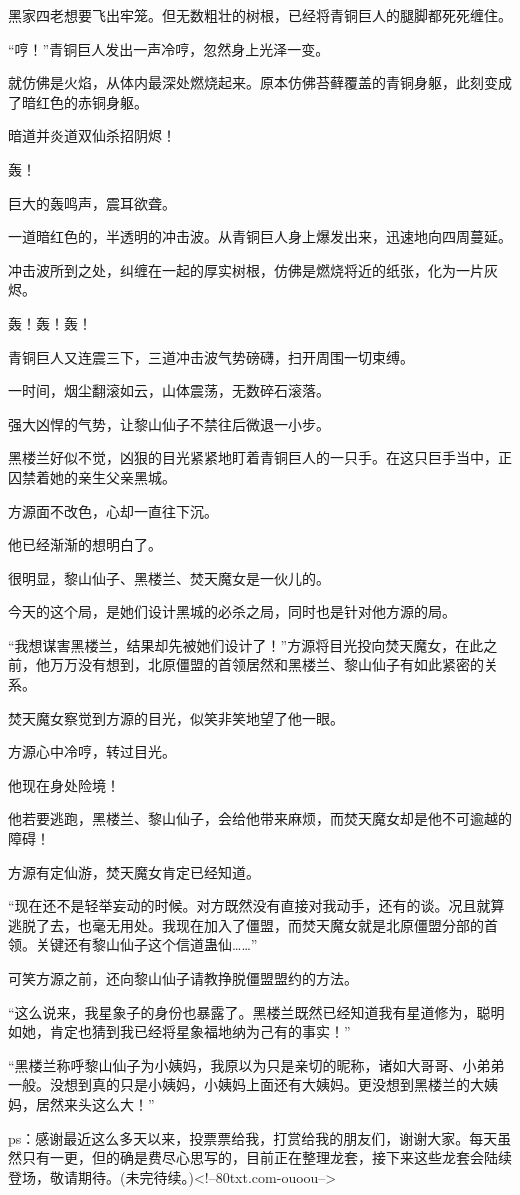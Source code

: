 \begin{this_body}
黑家四老想要飞出牢笼。但无数粗壮的树根，已经将青铜巨人的腿脚都死死缠住。

“哼！”青铜巨人发出一声冷哼，忽然身上光泽一变。

就仿佛是火焰，从体内最深处燃烧起来。原本仿佛苔藓覆盖的青铜身躯，此刻变成了暗红色的赤铜身躯。

暗道并炎道双仙杀招阴烬！

轰！

巨大的轰鸣声，震耳欲聋。

一道暗红色的，半透明的冲击波。从青铜巨人身上爆发出来，迅速地向四周蔓延。

冲击波所到之处，纠缠在一起的厚实树根，仿佛是燃烧将近的纸张，化为一片灰烬。

轰！轰！轰！

青铜巨人又连震三下，三道冲击波气势磅礴，扫开周围一切束缚。

一时间，烟尘翻滚如云，山体震荡，无数碎石滚落。

强大凶悍的气势，让黎山仙子不禁往后微退一小步。

黑楼兰好似不觉，凶狠的目光紧紧地盯着青铜巨人的一只手。在这只巨手当中，正囚禁着她的亲生父亲黑城。

方源面不改色，心却一直往下沉。

他已经渐渐的想明白了。

很明显，黎山仙子、黑楼兰、焚天魔女是一伙儿的。

今天的这个局，是她们设计黑城的必杀之局，同时也是针对他方源的局。

“我想谋害黑楼兰，结果却先被她们设计了！”方源将目光投向焚天魔女，在此之前，他万万没有想到，北原僵盟的首领居然和黑楼兰、黎山仙子有如此紧密的关系。

焚天魔女察觉到方源的目光，似笑非笑地望了他一眼。

方源心中冷哼，转过目光。

他现在身处险境！

他若要逃跑，黑楼兰、黎山仙子，会给他带来麻烦，而焚天魔女却是他不可逾越的障碍！

方源有定仙游，焚天魔女肯定已经知道。

“现在还不是轻举妄动的时候。对方既然没有直接对我动手，还有的谈。况且就算逃脱了去，也毫无用处。我现在加入了僵盟，而焚天魔女就是北原僵盟分部的首领。关键还有黎山仙子这个信道蛊仙……”

可笑方源之前，还向黎山仙子请教挣脱僵盟盟约的方法。

“这么说来，我星象子的身份也暴露了。黑楼兰既然已经知道我有星道修为，聪明如她，肯定也猜到我已经将星象福地纳为己有的事实！”

“黑楼兰称呼黎山仙子为小姨妈，我原以为只是亲切的昵称，诸如大哥哥、小弟弟一般。没想到真的只是小姨妈，小姨妈上面还有大姨妈。更没想到黑楼兰的大姨妈，居然来头这么大！”

ps：感谢最近这么多天以来，投票票给我，打赏给我的朋友们，谢谢大家。每天虽然只有一更，但的确是费尽心思写的，目前正在整理龙套，接下来这些龙套会陆续登场，敬请期待。(未完待续。)<!--80txt.com-ouoou-->

\end{this_body}

